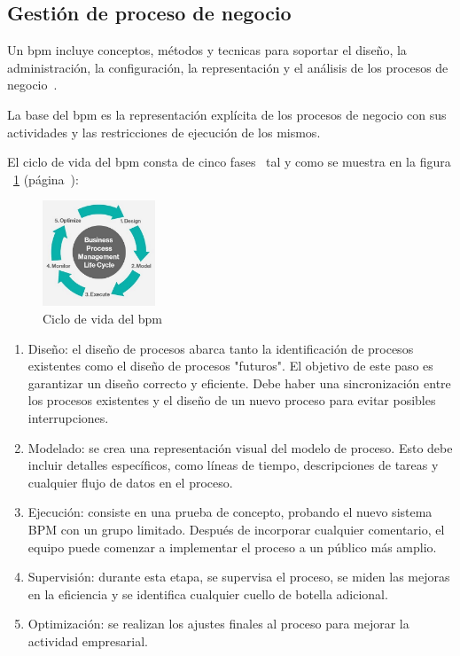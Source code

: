 \subsection{Gestión de proceso de negocio}

Un \acrfull{bpm} incluye conceptos, métodos y tecnicas para soportar el diseño, la administración, la configuración, la representación y el análisis de los procesos de negocio~\cite{Weske}.

La base del \acrshort{bpm} es la representación explícita de los procesos de negocio con sus actividades y las restricciones de ejecución de los mismos.


El ciclo de vida del \acrshort{bpm} consta de cinco fases~\cite{bpmLifecycle} tal y como se muestra en la figura ~\ref{fig:lifecycle-bpm} (página~\pageref{fig:lifecycle-bpm}):


\begin{figure}[hp!]
  \centering
  \includegraphics[width=0.30\textwidth]{imaxes/bpm-lifecycle.png}
  \caption{Ciclo de vida del \acrshort{bpm}}
  \label{fig:lifecycle-bpm}
\end{figure}

\begin{enumerate}
\item Diseño: el diseño de procesos abarca tanto la identificación de procesos existentes como el diseño de procesos "futuros". El objetivo de este paso es garantizar un diseño correcto y eficiente. Debe haber una sincronización entre los procesos existentes y el diseño de un nuevo proceso para evitar posibles interrupciones.
\item Modelado: se crea una representación visual del modelo de proceso. Esto debe incluir detalles específicos, como líneas de tiempo, descripciones de tareas y cualquier flujo de datos en el proceso. 
\item Ejecución: consiste en una prueba de concepto, probando el nuevo sistema BPM con un grupo limitado. Después de incorporar cualquier comentario, el equipo puede comenzar a implementar el proceso a un público más amplio.
\item Supervisión:  durante esta etapa, se supervisa el proceso, se miden las mejoras en la eficiencia y se identifica cualquier cuello de botella adicional.
\item Optimización: se realizan los ajustes finales al proceso para mejorar la actividad empresarial.

\end{enumerate}

